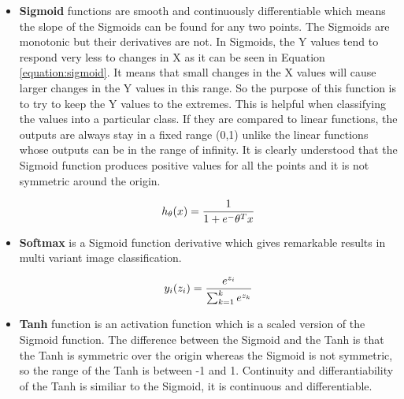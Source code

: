         \begin{itemize}

            \item \textbf{Sigmoid} functions are smooth and continuously differentiable which means the slope of the Sigmoids can be found for any two points.
                    The Sigmoids are monotonic but their derivatives are not.
                    In Sigmoids, the Y values tend to respond very less to changes in X as it can be seen in Equation \eqref{equation:sigmoid}.
                    It means that small changes in the X values will cause larger changes in the Y values in this range.
                    So the purpose of this function is to try to keep the Y values to the extremes.
                    This is helpful when classifying the values into a particular class.
                    If they are compared to linear functions, the outputs are always stay in a fixed range (0,1) unlike the linear functions whose outputs can be in the range of infinity.
                    It is clearly understood that the Sigmoid function produces positive values for all the points and it is not symmetric around the origin.

                    \begin{equation}
                        h_ \theta (x) =  \frac{\mathrm{1} }{\mathrm{1} + e^- \theta^Tx } \label{equation:sigmoid} \\
                    \end{equation}

            \item \textbf{Softmax} is a Sigmoid function derivative which gives remarkable results in multi variant image classification.

                    \begin{equation}
                        y_i(z_i) = \frac{e^{z_i}}{ \sum\nolimits_{k=1}^{k}{e^{z_k}} } \label{equation:softmax} \\
                    \end{equation}

            \item \textbf{Tanh} function is an activation function which is a scaled version of the Sigmoid function.
                    The difference between the Sigmoid and the Tanh is that the Tanh is symmetric over the origin whereas the Sigmoid is not symmetric, so the range of the Tanh is between -1 and 1.
                    Continuity and differantiability of the Tanh is similiar to the Sigmoid, it is continuous and differentiable.


\end{itemize}
